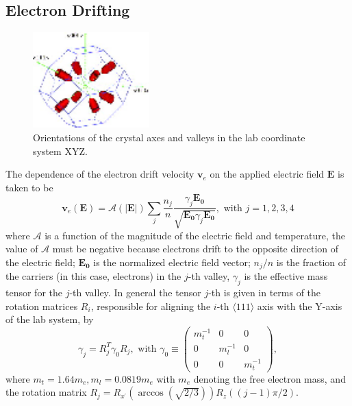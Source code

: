 \subsection{Electron Drifting}
\label{sec:elec}
\begin{figure}[tbhp]
  \centering
  \includegraphics[width=0.4\textwidth]{valleys.eps}  
  \caption{Orientations of the crystal axes and valleys in the lab coordinate system XYZ.}
  \label{fig:valley}
\end{figure}

The dependence of the electron drift velocity $\mathbf{v}_{e}$ on the applied electric field $\mathbf{E}$ is taken to be
\begin{equation}
  \label{eq:ed}
  \mathbf{v}_{e}(\mathbf{E}) = \mathcal{A}(|\mathbf{E}|) \sum_{j} \frac{n_{j}}{n}     \frac{\gamma_{j}\mathbf{E_{0}}}     {\sqrt{\mathbf{E_{0}}\gamma_{j}\mathbf{E_{0}}}},  \mbox{ with }     j=1,2,3,4
\end{equation}
where $\mathcal{A}$ is a function of the magnitude of the electric field and temperature, the value of $\mathcal{A}$ must be negative because electrons drift to the opposite direction of the electric field; $\mathbf{E_{0}}$ is the normalized electric field vector; $n_{j}/n$ is the fraction  of the carriers (in this case, electrons) in the $j$-th valley, $\gamma_{j}$ is the effective mass tensor for the $j$-th valley. In general the tensor $j$-th is given in terms of the rotation matrices $R_{i}$, responsible for aligning the $i$-th $\langle 111 \rangle$ axis with the Y-axis of the lab system, by
\begin{equation}
  \label{eq:gammas}
  \gamma_{j} = R_{j}^{T}\gamma_{0}R_{j}, \mbox{ with } \gamma_{0}   \equiv \left(
    \begin{array}{ccc}
      m_{t}^{-1} & 0 & 0 \\
      0 & m_{l}^{-1} & 0 \\
      0 & 0 & m_{t}^{-1}
    \end{array} \right),
\end{equation}
where $m_{t} = 1.64m_{e}, m_{l} = 0.0819m_{e}$ with $m_{e}$ denoting the free electron mass, and the rotation matrix $R_{j} = R_{x^{\prime}}(\arccos(\sqrt{2/3}))R_{z}((j-1)\pi/2)$.

